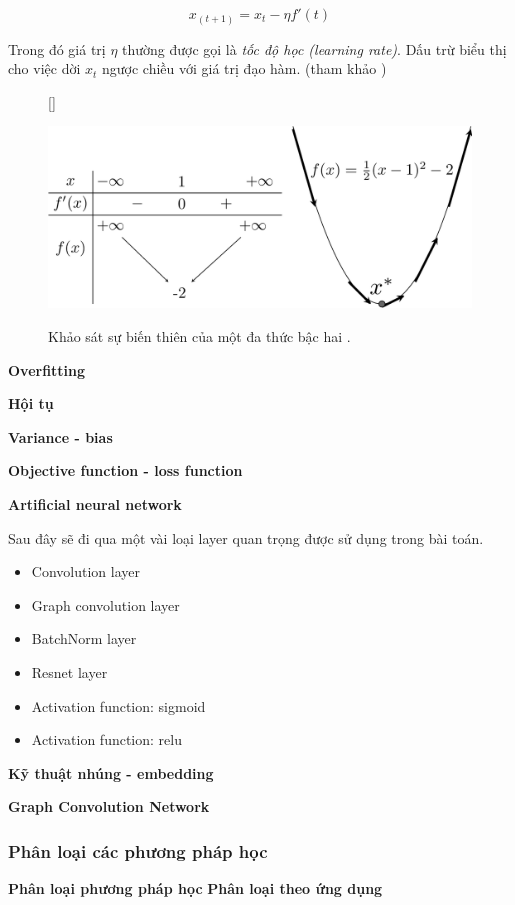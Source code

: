 \begin{equation}
x_(t+1) = x_t - \eta f'(t) 
\end{equation}

Trong đó giá trị $\eta$ thường được gọi là \textit{tốc độ học (learning rate)}. Dấu trừ biểu thị cho việc dời $x_t$ ngược chiều với giá trị đạo hàm. (tham khảo \cite{tiep2018machine}) 
\begin{figure}[t]
    [\FBwidth]
    {\caption{ 
    Khảo sát sự biến thiên của một đa thức bậc hai \cite{tiep2018machine}. 
    }
    \label{fig:grad}}
    { %
    \includegraphics[width=.5\textwidth]{asset/pdf/gradient_descent.pdf}
    }
\end{figure}

\textbf{Overfitting}


\textbf{Hội tụ}

\textbf{Variance - bias}

\textbf{Objective function - loss function}

\textbf{Artificial neural network}

Sau đây sẽ đi qua một vài loại layer quan trọng được sử dụng trong bài toán.
\begin{itemize}
    \item Convolution layer
    \item Graph convolution layer 
    \item BatchNorm layer
    \item Resnet layer
    \item Activation function: sigmoid
    \item Activation function: relu
\end{itemize}

\textbf{Kỹ thuật nhúng -  embedding}

\textbf{Graph Convolution Network}


\subsubsection{Phân loại các phương pháp học}
\textbf{Phân loại phương pháp học}
\textbf{Phân loại theo ứng dụng}

